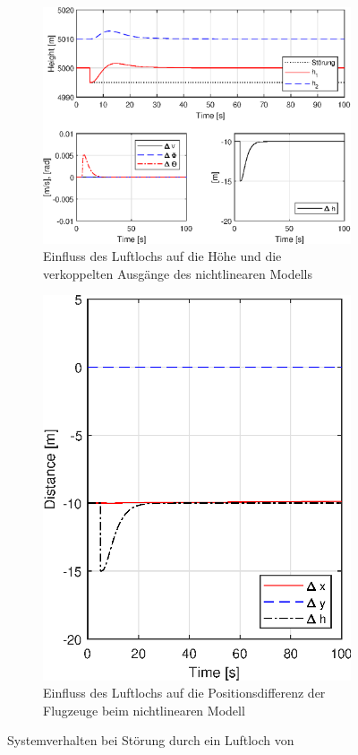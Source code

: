   \begin{figure}[h] %
 	\centering
 	\begin{subfigure}{.49\textwidth}
 		\centering
 		\includegraphics[width=\linewidth]{./Bilder/outputs_luftloch.eps}
 		\caption{Einfluss des Luftlochs auf die Höhe und die verkoppelten Ausgänge des nichtlinearen Modells}
 		\label{fig:outputs_luftloch}
 	\end{subfigure}
 	\hfill
 	\begin{subfigure}{.49\textwidth}
 		\centering
 		\includegraphics[width=0.65\linewidth]{./Bilder/distance_xyz_luftloch.eps}
 		\caption{Einfluss des Luftlochs auf die Positionsdifferenz der Flugzeuge beim nichtlinearen Modell}
 		\label{fig:distance_xyz_luftloch}
 	\end{subfigure}
 	\caption{Systemverhalten bei Störung durch ein Luftloch von }
 	\label{fig:luftloch}
 \end{figure}

